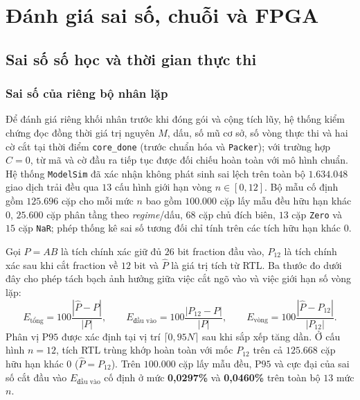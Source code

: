 \chapter{Đánh giá sai số, chuỗi và FPGA}
\label{ch:measurements}
\section{Sai số số học và thời gian thực thi}

\subsection{Sai số của riêng bộ nhân lặp}
Để đánh giá riêng khối nhân trước khi đóng gói và cộng tích lũy, hệ thống kiểm
chứng đọc đồng thời giá trị nguyên $M$, dấu, số mũ cơ sở, số vòng thực thi và
hai cờ cắt tại thời điểm \texttt{core\_done} (trước chuẩn hóa và \texttt{Packer});
với trường hợp $C=0$, từ mã và cờ đầu ra tiếp tục được đối chiếu hoàn toàn với
mô hình chuẩn. Hệ thống \texttt{ModelSim} đã xác nhận không phát sinh sai lệch trên
toàn bộ $1.634.048$ giao dịch trải đều qua $13$ cấu hình giới hạn vòng $n \in [0, 12]$.
Bộ mẫu cố định gồm $125.696$ cặp cho mỗi mức $n$ bao gồm $100.000$ cặp lấy mẫu
đều hữu hạn khác $0$, $25.600$ cặp phân tầng theo \textit{regime}/dấu, $68$ cặp
chủ đích biên, $13$ cặp \texttt{Zero} và $15$ cặp \texttt{NaR}; phép thống kê
sai số tương đối chỉ tính trên các tích hữu hạn khác $0$.

Gọi $P = AB$ là tích chính xác giữ đủ $26$ bit fraction đầu vào, $P_{12}$ là
tích chính xác sau khi cắt fraction về $12$ bit và $\widehat P$ là giá trị tích
từ RTL. Ba thước đo dưới đây cho phép tách bạch ảnh hưởng giữa việc cắt ngõ vào
và việc giới hạn số vòng lặp:
\[
E_{\text{tổng}}=100\frac{|\widehat P-P|}{|P|},\qquad
E_{\text{đầu vào}}=100\frac{|P_{12}-P|}{|P|},\qquad
E_{\text{vòng}}=100\frac{|\widehat P-P_{12}|}{|P_{12}|}.
\]
Phân vị $\mathrm{P95}$ được xác định tại vị trí $\lceil 0{,}95N\rceil$ sau khi
sắp xếp tăng dần. Ở cấu hình $n=12$, tích RTL trùng khớp hoàn toàn với mốc $P_{12}$
trên cả $125.668$ cặp hữu hạn khác $0$ ($\widehat P = P_{12}$). Trên $100.000$
cặp lấy mẫu đều, $\mathrm{P95}$ và cực đại của sai số cắt đầu vào $E_{\text{đầu vào}}$
cố định ở mức \textbf{0,0297\%} và \textbf{0,0460\%} trên toàn bộ $13$ mức $n$.



